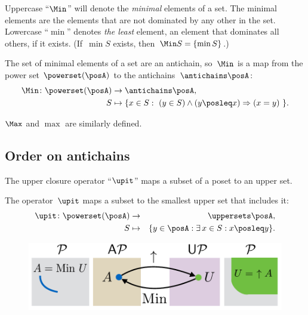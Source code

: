 Uppercase ``$\Min$'' will denote the \emph{minimal} elements of
a set. The minimal elements are the elements that are not dominated
by any other in the set. Lowercase ``$\min$'' denotes\emph{ the
least} element, an element that dominates all others, if it exists.
(If~$\min S$ exists, then~$\Min S=\{\min S\}$.)

The set of minimal elements of a set are an antichain, so~$\Min$
is a map from the power set $\powerset(\posA)$ to the antichains~$\antichains\posA$:
\begin{align*}
    \Min\colon\powerset(\posA) & \rightarrow\antichains\posA,\\
    S & \mapsto\{x\in S:\ (y\in S)\wedge(y\posleq x)\Rightarrow(x=y)\ \}.
\end{align*}

$\Max$ and $\max$ are similarly defined.

\subsection{Order on antichains}

The upper closure operator ``$\upit$'' maps a subset of a poset
to an upper set.
\begin{definition}
    The operator~$\upit$ maps a subset to the smallest upper set that
    includes it:
    \begin{eqnarray*}
        \upit\colon\powerset(\posA) & \rightarrow & \uppersets\posA,\\
        S & \mapsto & \{y\in\posA:\exists\,x\in S:x\posleq y\}.
    \end{eqnarray*}
\end{definition}

\begin{figure}[h]
    \begin{center}
        \includegraphics[scale=0.4]{gmcdp_antichains_upsets}
    \end{center}
    \caption{\label{fig:antichains_upsets}}
\end{figure}

